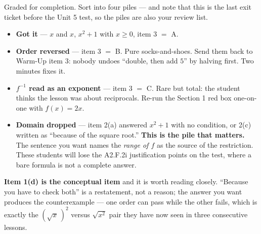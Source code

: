 \documentclass[10pt]{article}
\begin{document}
\begin{teachernote}
\small Graded for completion. Sort into four piles --- and note that this is the last exit ticket
before the Unit 5 test, so the piles are also your review list.
\begin{itemize}[leftmargin=1.3em, nosep]
  \item \textbf{Got it} --- $x$ and $x$, $x^{2}+1$ with $x\ge0$, item 3 $=$ A.
  \item \textbf{Order reversed} --- item 3 $=$ B. Pure socks-and-shoes. Send them back to Warm-Up
        item 3: nobody undoes ``double, then add $5$'' by halving first. Two minutes fixes it.
  \item \textbf{$f^{-1}$ read as an exponent} --- item 3 $=$ C. Rare but total: the student thinks
        the lesson was about reciprocals. Re-run the Section 1 red box one-on-one with $f(x)=2x$.
  \item \textbf{Domain dropped} --- item 2(a) answered $x^{2}+1$ with no condition, or 2(c) written
        as ``because of the square root.'' \textbf{This is the pile that matters.} The sentence you
        want names the \emph{range of $f$} as the source of the restriction. These students will
        lose the A2.F.2i justification points on the test, where a bare formula is not a complete
        answer.
\end{itemize}
\textbf{Item 1(d) is the conceptual item} and it is worth reading closely. ``Because you have to
check both'' is a restatement, not a reason; the answer you want produces the counterexample --- one
order can pass while the other fails, which is exactly the $\left(\sqrt{x}\,\right)^{2}$ versus
$\sqrt{x^{2}}$ pair they have now seen in three consecutive lessons.
\end{teachernote}
\end{document}
